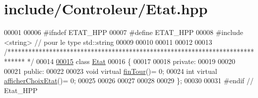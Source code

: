 \hypertarget{_etat_8hpp_source}{\section{include/\-Controleur/\-Etat.hpp}
}

\begin{DoxyCode}
00001 
00006 \textcolor{preprocessor}{#ifndef ETAT\_HPP}
00007 \textcolor{preprocessor}{}\textcolor{preprocessor}{#define ETAT\_HPP}
00008 \textcolor{preprocessor}{}\textcolor{preprocessor}{#include <string>} \textcolor{comment}{// pour le type std::string}
00009 
00010 
00011 
00012 
00013 \textcolor{comment}{/*****************************************************************************
      */}
00014 
\hypertarget{_etat_8hpp_source_l00015}{}\hyperlink{class_etat}{00015} \textcolor{keyword}{class }\hyperlink{class_etat}{Etat}
00016 \{
00017 
00018     \textcolor{keyword}{private}:
00019         
00020     
00021     \textcolor{keyword}{public}:
00022         
00023         \textcolor{keywordtype}{void} \textcolor{keyword}{virtual} \hyperlink{class_etat_a41a3505b7477318292582ae544e7e0dd}{finTour}()= 0;
00024         \textcolor{keywordtype}{int} \textcolor{keyword}{virtual} \hyperlink{class_etat_ad76848f13da0e8e7f690a745e3075ab2}{afficherChoixEtat}()= 0;
00025         
00026         
00027         
00028         
00029 \};
00030 
00031 \textcolor{preprocessor}{#endif // Etat\_HPP      }
\end{DoxyCode}
